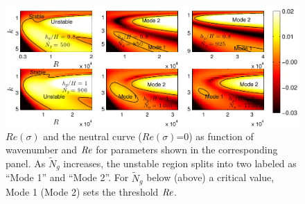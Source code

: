 \documentclass{jfm}
\newcommand{\Ndg}{\tilde{N}_g}
\begin{document}
\begin{figure}
 \includegraphics[width=\textwidth]{SetAll_imgsc}

\caption{
$Re(\sigma)$ and the neutral curve ($Re(\sigma)$=0) as function of wavenumber and $\mbox{\textit{Re}}$ for parameters shown in the corresponding panel.  
As $\Ndg$ increases, the unstable region splits into two labeled as ``Mode 1'' and ``Mode 2''. 
For $\Ndg$ below (above) a critical value, Mode 1 (Mode 2) sets the threshold $\mbox{\textit{Re}}$.
}
\label{K_Re_sigma_set3}
\end{figure}
\end{document}

